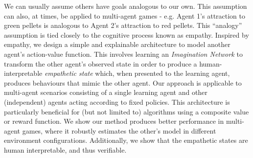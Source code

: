 



\iffalse
We can usually assume others have goals analogous to our own, and this assumption is useful for human cognitive processes like empathy where we can build on similarities between us and others to better understand the behaviour of others. Inspired by empathy we apply this process to multi-agent games by designing a simple and interpretable architecture to model another agent's action-value function. This involves learning an \emph{Imagination Network} to transform the other agent's observed state in order to produce a human-interpretable \emph{empathetic state} which, when presented to the learning agent, produces behaviours that mimic the other agent. Our approach is applicable to multi-agent scenarios consisting of a single learning agent and other (independent) agents acting according to fixed policies. This architecture is particularly beneficial for (but not limited to) algorithms using a composite value or reward function. We show our method produces better performance in multi-agent games, where it robustly estimates the other's model in different environment configurations. Additionally, we show that the empathetic states are human interpretable, and thus verifiable.
\fi

We can usually assume others have goals analogous to our own. This assumption can also, at times, be applied to multi-agent games - e.g. Agent 1's attraction to green pellets is analogous to Agent 2's attraction to red pellets. This ``analogy'' assumption is tied closely to the cognitive process known as empathy. Inspired by empathy, we design a simple and explainable architecture to model another agent's action-value function. This involves learning an \emph{Imagination Network} to transform the other agent's observed state in order to produce a human-interpretable \emph{empathetic state} which, when presented to the learning agent, produces behaviours that mimic the other agent. Our approach is applicable to multi-agent scenarios consisting of a single learning agent and other (independent) agents acting according to fixed policies. This architecture is particularly beneficial for (but not limited to) algorithms using a composite value or reward function. We show our method produces better performance in multi-agent games, where it robustly estimates the other's model in different environment configurations. Additionally, we show that the empathetic states are human interpretable, and thus verifiable.


